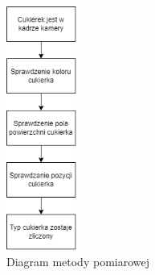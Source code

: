 \documentclass{article}
\begin{document}
\begin{figure}[H]
    \centering
    \includegraphics[height=8cm]{diagramMetody.png}
    \caption{Diagram metody pomiarowej}
    \label{fig:diagramMetody}
\end{figure}
\end{document}
